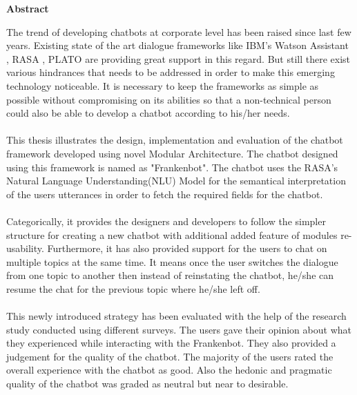 \thispagestyle{empty}
\vspace*{1.0cm}

\begin{center}
    \textbf{Abstract}
\end{center}

\vspace*{0.5cm}

\noindent
The trend of developing chatbots at corporate level has been raised since last few years. Existing state of the art dialogue frameworks like IBM's Watson Assistant \cite{ibmwatson}, RASA \cite{rasa}, PLATO \cite{plato} are providing great support in this regard. But still there exist various hindrances that needs to be addressed in order to make this emerging technology noticeable. It is necessary to keep the frameworks as simple as possible without compromising on its abilities so that a non-technical person could also be able to develop a chatbot according to his/her needs.
\\~\\
This thesis illustrates the design, implementation and evaluation of the chatbot framework developed using novel Modular Architecture. The chatbot designed using this framework is named as "Frankenbot". The chatbot uses the RASA's Natural Language Understanding(NLU) Model for the semantical interpretation of the users utterances in order to fetch the required fields for the chatbot. 
\\~\\
Categorically, it provides the designers and developers to follow the simpler structure for creating a new chatbot with additional added feature of modules re-usability. Furthermore, it has also provided support for the users to chat on multiple topics at the same time. It means once the user switches the dialogue from one topic to another then instead of reinstating the chatbot, he/she can resume the chat for the previous topic where he/she left off.
\\~\\
This newly introduced strategy has been evaluated with the help of the research study conducted using different surveys. The users gave their opinion about what they experienced while interacting with the Frankenbot. They also provided a judgement for the quality of the chatbot. The majority of the users rated the overall experience with the chatbot as good. Also the hedonic and pragmatic quality of the chatbot was graded as neutral but near to desirable.

 
 



